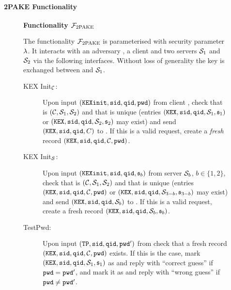 \paragraph{2PAKE Functionality}

\begin{figure}[tbp]
\begin{mdframed}[innertopmargin=10pt]
\begin{center}
{\bf Functionality $\mathcal{F}_{\mathrm{2PAKE}}$}
\end{center}
The functionality $\mathcal{F}_{\mathrm{2PAKE}}$ is parameterised with security parameter $\lambda$.
It interacts with an adversary \SIM, a client \Client and two servers $\mathcal{S}_1$ and $\mathcal{S}_2$ via the following interfaces.
Without loss of generality the key is exchanged between \Client and $\mathcal{S}_1$.

\begin{description}

  \item[KEX Init$_\mathcal{C}$:] Upon input $(\mathtt{KEXinit}, \mathtt{sid}, \mathtt{qid}, \mathtt{pwd})$ from client \Client, check that \sid is $(\mathcal{C}, \mathcal{S}_1, \mathcal{S}_2)$ and that \qid is unique (entries $(\mathtt{KEX}, \mathtt{sid}, \mathtt{qid}, \mathcal{S}_{1}, \mathfrak{s}_{1})$ or $(\mathtt{KEX}, \mathtt{sid}, \mathtt{qid}, \mathcal{S}_{2}, \mathfrak{s}_{2})$ may exist) and send $(\mathtt{KEX}, \mathtt{sid}, \mathtt{qid}, C)$ to \SIM.
      If this is a valid request, create a \emph{fresh} record $(\mathtt{KEX}, \mathtt{sid}, \mathtt{qid}, \mathcal{C}, \mathtt{pwd})$.
  
  \item[KEX Init$_\mathcal{S}$:] Upon input $(\mathtt{KEXinit}, \mathtt{sid}, \mathtt{qid}, \mathfrak{s}_b)$ from server $\mathcal{S}_b$, $b\in\{1,2\}$, check that \sid is $(\mathcal{C}, \mathcal{S}_1, \mathcal{S}_2)$ and that \qid is unique (entries $(\mathtt{KEX}, \mathtt{sid}, \mathtt{qid}, \mathcal{C}, \mathtt{pwd})$ or $(\mathtt{KEX}, \mathtt{sid}, \mathtt{qid}, \mathcal{S}_{3-b}, \mathfrak{s}_{3-b})$ may exist) and send $(\mathtt{KEX}, \mathtt{sid}, \mathtt{qid}, \mathcal{S}_b)$ to \SIM.
      If this is a valid request, create a fresh record $(\mathtt{KEX}, \mathtt{sid}, \mathtt{qid}, \mathcal{S}_b, \mathfrak{s}_b)$.
    
  \item[TestPwd:] Upon input $(\mathtt{TP}, \mathtt{sid}, \mathtt{qid}, \mathtt{pwd}')$ from \SIM check that a fresh record $(\mathtt{KEX}, \mathtt{sid}, \mathtt{qid}, \mathcal{C}, \mathtt{pwd})$ exists. 
      If this is the case, mark $(\mathtt{KEX}, \mathtt{sid}, \mathtt{qid}, \mathcal{S}_1, \mathfrak{s}_1)$ as \compromised and reply with ``correct guess'' if $\mathtt{pwd}=\mathtt{pwd}'$, and mark it as \interrupted and reply with ``wrong guess'' if $\mathtt{pwd}\not=\mathtt{pwd}'$.
    
      

\end{description}
\end{mdframed}
\end{figure}
